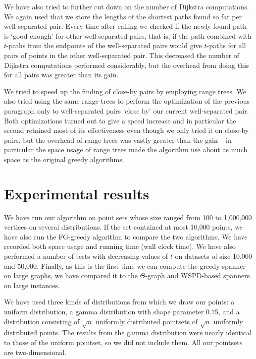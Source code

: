 \documentclass[runningheads,envcountsame,oribibl,orivec]{llncs}
\begin{document}
We have also tried to further cut down on the number of Dijkstra computations. We again used that we store the lengths of the shortest paths found so far per well-separated pair. Every time after calling  we checked if the newly found path is `good enough' for other well-separated pairs, that is, if the path combined with $t$-paths from the endpoints of the well-separated pairs would give $t$-paths for all pairs of points in the other well-separated pair. This decreased the number of Dijkstra computations performed considerably, but the overhead from doing this for all pairs was greater than its gain.

We tried to speed up the finding of close-by pairs by employing range trees. We also tried using the same range trees to perform the optimization of the previous paragraph only to well-separated pairs `close by' our current well-separated pair. Both optimizations turned out to give a speed increase and in particular the second retained most of its effectiveness even though we only tried it on close-by pairs, but the overhead of range trees was vastly greater than the gain -- in particular the space usage of range trees made the algorithm use about as much space as the original greedy algorithms.

\section{Experimental results} \label{section:results}

We have run our algorithm on point sets whose size ranged from 100 to 1,000,000 vertices on several distributions. If the set contained at most 10,000 points, we have also run the FG-greedy algorithm to compare the two algorithms. We have recorded both space usage and running time (wall clock time). We have also performed a number of tests with decreasing values of $t$ on datasets of size 10,000 and 50,000. Finally, as this is the first time we can compute the greedy spanner on large graphs, we have compared it to the $\Theta$-graph and WSPD-based spanners on large instances.

We have used three kinds of distributions from which we draw our points: a uniform distribution, a gamma distribution with shape parameter 0.75, and a distribution consisting of $\sqrt{n}$ uniformly distributed pointsets of $\sqrt{n}$ uniformly distributed points. The results from the gamma distribution were nearly identical to those of the uniform pointset, so we did not include them. All our pointsets are two-dimensional.
\end{document}
